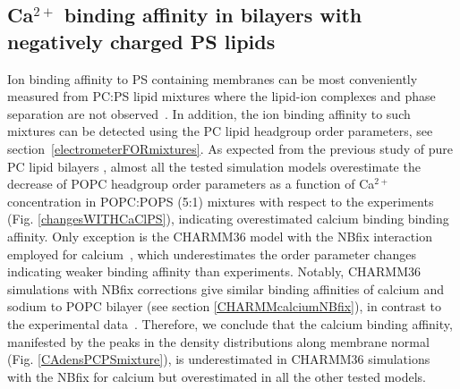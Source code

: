 \documentclass[aps,prl,superscriptaddress,twocolumn]{revtex4}
\begin{document}
\subsection{Ca$^{2+}$ binding affinity in bilayers with negatively charged PS lipids}

Ion binding affinity to PS containing membranes can be most conveniently measured 
from PC:PS lipid mixtures where the lipid-ion complexes and phase separation are 
not observed~\cite{feigenson86,mattai89,roux90,roux91}. In addition, the ion
binding affinity to such mixtures can be detected using the PC lipid headgroup order parameters,
see section~\ref{electrometerFORmixtures}. As expected from the previous study of pure PC lipid
bilayers \cite{catte16}, almost all the tested simulation models overestimate the decrease of
POPC headgroup order parameters as a function of Ca$^{2+}$ concentration in POPC:POPS (5:1) mixtures 
with respect to the experiments \cite{roux90} (Fig. \ref{changesWITHCaClPS}), indicating overestimated
calcium binding binding affinity. Only exception is the CHARMM36 model with the NBfix
interaction employed for calcium~\cite{kim16}, which underestimates the order parameter changes
indicating weaker binding affinity than experiments.
Notably, CHARMM36 simulations with NBfix corrections \cite{venable13,kim16} give similar binding affinities of
calcium and sodium to POPC bilayer (see section \ref{CHARMMcalciumNBfix}), in contrast to the experimental 
data~\cite{cevc90,akutsu81,altenbach84}. Therefore, we conclude that the calcium binding affinity,
manifested by the peaks in the density distributions along membrane normal (Fig. \ref{CAdensPCPSmixture}),
is underestimated in CHARMM36 simulations with the NBfix for calcium \cite{kim16} but overestimated 
in all the other tested models.

\end{document}
